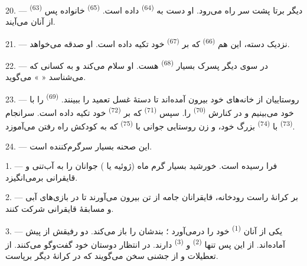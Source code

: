 20. ---  \textsuperscript{(63)} دیگر برتا پشت سر راه
می‌رود. او دست به  \textsuperscript{(64)} داده است.
 \textsuperscript{(65)} خانواده پس از آنان می‌آیند.

\VUsaut{4.6mm}
\VUsaut{3.4mm}

21. --- نزدیک دسته، این هم  \textsuperscript{(66)} که بر
 \textsuperscript{(67)} خود تکیه داده است. او صدقه
می‌خواهد.

22. --- در سوی دیگر پسرک بسیار  \textsuperscript{(68)}
هست. او سلام می‌کند و به کسانی که می‌شناسد «  »
می‌گوید.

23. --- روستاییان از خانه‌های خود بیرون آمده‌اند تا دستهٔ غسل تعمید را
ببینند.  \textsuperscript{(69)} را با  خود می‌بینیم و در کنارش 
\textsuperscript{(70)} را. سپس  \textsuperscript{(71)}
که بر  \textsuperscript{(72)} خود تکیه داده است. سرانجام
 \textsuperscript{(73)} با 
\textsuperscript{(74)} بزرگ خود، و زن روستایی جوانی با  \textsuperscript{(75)} که به کودکش راه رفتن می‌آموزد.

24. --- این صحنه بسیار سرگرم‌کننده است.

\VUsaut{4.0mm}
\VUsaut{3.0mm}

\VUsaut{2.4mm}

\VUsaut{3.0mm}

1. ---  فرا رسیده است. خورشید بسیار گرم ماه
 (ژوئیه یا ) جوانان را به آب‌تنی و قایقرانی
برمی‌انگیزد.

2. --- بر کرانهٔ راست رودخانه، قایقرانان جامه از تن بیرون می‌آورند تا
در بازی‌های آبی و مسابقهٔ قایقرانی شرکت کنند.

3. --- یکی از آنان  \textsuperscript{(1)} خود را
درمی‌آورد ؛ بندشان را باز می‌کند. دو رفیقش از پیش آماده‌اند. از این
پس تنها  \textsuperscript{(2)} و  \textsuperscript{(3)} دارند. در انتظار دوستان خود گفت‌وگو
می‌کنند. از تعطیلات و از جشنی سخن می‌گویند که در کرانهٔ دیگر برپاست.

